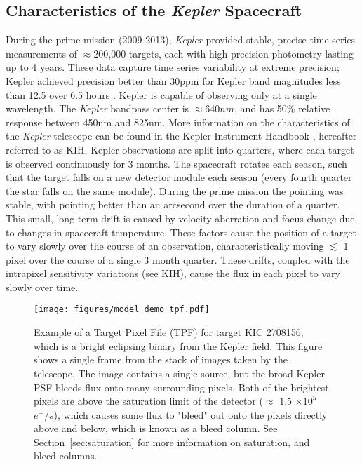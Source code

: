 \documentclass[iop]{emulateapj}
\newcommand{\kepler}{\emph{Kepler}\xspace}
\begin{document}
\subsection{Characteristics of the \kepler Spacecraft}

During the prime mission (2009-2013), \kepler provided stable, precise time series measurements of $\approx$200,000 targets, each with high precision photometry lasting up to 4 years. These data capture time series variability at extreme precision; Kepler achieved precision better than 30ppm for Kepler band magnitudes less than 12.5 over 6.5 hours \citep{gilliland}. Kepler is capable of observing only at a single wavelength. The \kepler bandpass center is $\approx 640nm$, and has 50\% relative response between 450nm and 825nm. More information on the characteristics of the \kepler telescope can be found in the Kepler Instrument Handbook \citep{kih}, hereafter referred to as KIH. Kepler observations are split into quarters, where each target is observed continuously for 3 months. The spacecraft rotates each season, such that the target falls on a new detector module each season (every fourth quarter the star falls on the same module). During the prime mission the pointing was stable, with pointing better than an arcsecond over the duration of a quarter. This small, long term  drift is caused by velocity aberration \citep[see][]{jenkins2010} and focus change due to changes in spacecraft temperature. These factors cause the position of a target to vary slowly over the course of an observation, characteristically moving $\lesssim$ 1 pixel over the course of a single 3 month quarter. These drifts, coupled with the intrapixel sensitivity variations (see KIH), cause the flux in each pixel to vary slowly over time.


\begin{figure}
    \centering
    \texttt{[image: figures/model\_demo\_tpf.pdf]}
    \caption{Example of a Target Pixel File (TPF) for target KIC 2708156, which is a bright eclipsing binary from the Kepler field. This figure shows a single frame from the stack of images taken by the telescope. The image contains a single source, but the broad Kepler PSF bleeds flux onto many surrounding pixels. Both of the brightest pixels are above the saturation limit of the detector ($\approx$ 1.5 $\times 10^5$ $e^-/s$), which causes some flux to "bleed" out onto the pixels directly above and below, which is known as a bleed column. See Section~\ref{sec:saturation} for more information on saturation, and bleed columns.}
    \label{fig:tpf_demo}
\end{figure}
\end{document}
